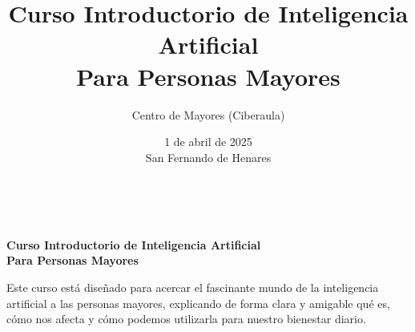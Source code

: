 \documentclass[12pt]{article}
\title{\Huge Curso Introductorio de Inteligencia Artificial\\ \Large Para Personas Mayores}
\author{Centro de Mayores (Ciberaula)}
\date{1 de abril de 2025\\San Fernando de Henares}
\begin{document}
\newcommand\portada{
	\thispagestyle{empty}
	\null
	\newpage
}
\portada
	
	
	\newpage
	~
	\thispagestyle{empty}
	\vspace*{2cm}
	\begin{center}
		\textbf{\Large Curso Introductorio de Inteligencia Artificial}\\[1ex]
		\textbf{Para Personas Mayores}\\[4ex]
	\end{center}
	
	\noindent Este curso está diseñado para acercar el fascinante mundo de la inteligencia artificial a las personas mayores, explicando de forma clara y amigable qué es, cómo nos afecta y cómo podemos utilizarla para nuestro bienestar diario.
	
\end{document}
